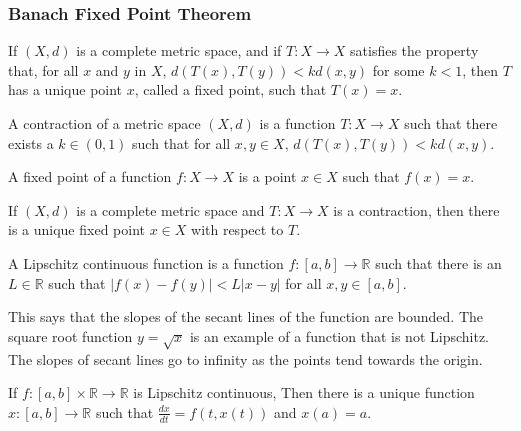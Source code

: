 \documentclass[crop=false,class=article,oneside]{standalone}
\begin{document}
        \subsubsection{Banach Fixed Point Theorem}
            If $(X,d)$ is a complete metric space,
            and if $T:X\rightarrow{X}$ satisfies
            the property that, for all $x$ and $y$
            in $X$, $d(T(x),T(y))<kd(x,y)$ for
            some $k<1$, then $T$ has a unique
            point $x$, called a fixed point,
            such that $T(x)=x$.
            \begin{definition}
                A contraction of a metric
                space $(X,d)$ is a function
                $T:{X}\rightarrow{X}$ such that there
                exists a $k\in(0,1)$ such that
                for all $x,y\in{X}$,
                $d(T(x),T(y))<kd(x,y)$.
            \end{definition}
            \begin{definition}
                A fixed point of a function
                $f:X\rightarrow{X}$ is a point
                $x\in{X}$ such that
                $f(x)=x$.
            \end{definition}
            \begin{theorem}
                If $(X,d)$ is a complete
                metric space and $T:X\rightarrow{X}$
                is a contraction, then there is
                a unique fixed point $x\in{X}$
                with respect to $T$.
            \end{theorem}
            \begin{definition}
                A Lipschitz continuous function is a
                function $f:[a,b]\rightarrow\mathbb{R}$
                such that there is an $L\in\mathbb{R}$
                such that
                $|f(x)-f(y)|<L|x-y|$ for all
                $x,y\in[a,b]$.
            \end{definition}
            This says that the slopes of the
            secant lines of the
            function are bounded. The square root
            function $y=\sqrt{x}$ is an example
            of a function that is not Lipschitz. The
            slopes of secant lines go to infinity
            as the points tend towards the origin.
            \begin{theorem}
                If $f:[a,b]\times\mathbb{R}%
                    \rightarrow\mathbb{R}$
                is Lipschitz continuous,
                Then there is a unique function
                $x:[a,b]\rightarrow\mathbb{R}$
                such that
                $\frac{dx}{dt}=f(t,x(t))$ and $x(a)=a$.
            \end{theorem}
\end{document}
